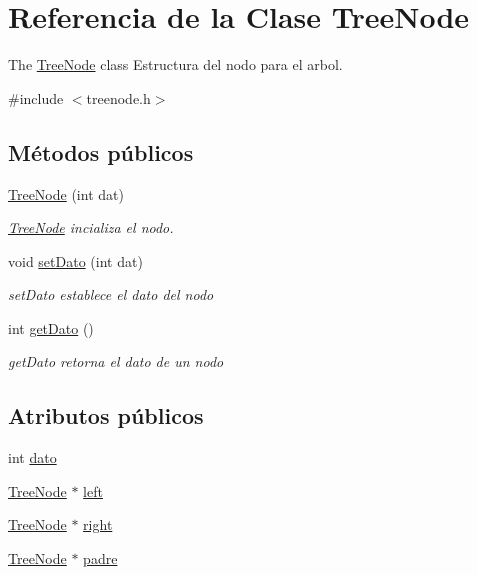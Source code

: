 \hypertarget{class_tree_node}{}\section{Referencia de la Clase Tree\+Node}
\label{class_tree_node}


The \mbox{\hyperlink{class_tree_node}{Tree\+Node}} class Estructura del nodo para el arbol.  




{\ttfamily \#include $<$treenode.\+h$>$}

\subsection*{Métodos públicos}
\begin{DoxyCompactItemize}
\item 
\mbox{\hyperlink{class_tree_node_a736fc461fefd4f39a0f9e826fe635bf9}{Tree\+Node}} (int dat)
\begin{DoxyCompactList}\small\item\em \mbox{\hyperlink{class_tree_node}{Tree\+Node}} incializa el nodo. \end{DoxyCompactList}\item 
void \mbox{\hyperlink{class_tree_node_a0a29e2ef92e47a4617371d917f6642cc}{set\+Dato}} (int dat)
\begin{DoxyCompactList}\small\item\em set\+Dato establece el dato del nodo \end{DoxyCompactList}\item 
int \mbox{\hyperlink{class_tree_node_af6a61a7d6b4769811dc7c0a8d5a8312d}{get\+Dato}} ()
\begin{DoxyCompactList}\small\item\em get\+Dato retorna el dato de un nodo \end{DoxyCompactList}\end{DoxyCompactItemize}
\subsection*{Atributos públicos}
\begin{DoxyCompactItemize}
\item 
int \mbox{\hyperlink{class_tree_node_a40d32c7fb4e335b91b8b63078fbf3b68}{dato}}
\item 
\mbox{\hyperlink{class_tree_node}{Tree\+Node}} $\ast$ \mbox{\hyperlink{class_tree_node_a5335e7d975822e87088ec2afdefb1736}{left}}
\item 
\mbox{\hyperlink{class_tree_node}{Tree\+Node}} $\ast$ \mbox{\hyperlink{class_tree_node_a71b4faa364404d671943562b352b1b74}{right}}
\item 
\mbox{\hyperlink{class_tree_node}{Tree\+Node}} $\ast$ \mbox{\hyperlink{class_tree_node_aa38d6c9fc05bcf7a2ff2d2ee58cc810b}{padre}}
\end{DoxyCompactItemize}


